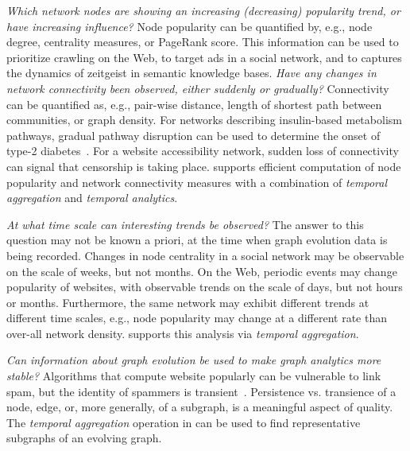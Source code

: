 %

{\em Which network nodes are showing an increasing (decreasing) popularity trend,
  or have increasing influence?}
Node popularity can be quantified by, e.g., node degree, centrality measures,
or PageRank score.  This information can be used to prioritize
crawling on the Web, to target ads in a social network, and to
captures the dynamics of zeitgeist in semantic knowledge bases.
%
{\em Have any changes in network connectivity been observed, either
  suddenly or gradually?} Connectivity can be quantified as,
e.g., pair-wise distance, length of shortest path between communities,
or graph density.  For networks describing insulin-based metabolism
pathways, gradual pathway disruption can be used to determine the
onset of type-2 diabetes~\cite{DBLP:journals/tcsb/BeyerTLSF10}.  For a
website accessibility network, sudden loss of connectivity can signal
that censorship is taking place.
%
\ql supports efficient computation of node popularity and network
connectivity measures with a combination of {\em temporal aggregation}
and {\em temporal analytics}.

{\em At what time scale can interesting trends be observed?} The
answer to this question may not be known a priori, at the time when
graph evolution data is being recorded.  Changes in node centrality in
a social network may be observable on the scale of weeks, but not
months.  On the Web, periodic events may change popularity
of websites, with observable trends on the scale of days, but not
hours or months.  Furthermore, the same network may
exhibit different trends at different time scales, e.g., node
popularity may change at a different rate than over-all network
density.  \ql supports this analysis via {\em temporal aggregation}.

{\em Can information about graph evolution be used to make graph
  analytics more stable?}  Algorithms that compute
website popularly can be vulnerable to link spam, but the identity 
of spammers is transient~\cite{Yang2007}.  Persistence 
vs. transience of a node, edge, or, more 
generally, of a subgraph, is a meaningful aspect of quality.  
  The {\em temporal aggregation} operation in \ql
{}can be used to find
representative subgraphs of an evolving graph.

